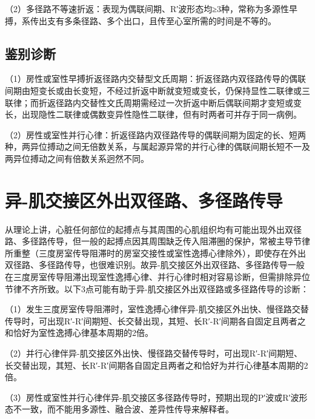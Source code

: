 （2）多径路不等速折返：表现为偶联间期、R′波形态均≥3种，常称为多源性早搏，系传出支有多条径路、多个出口，且传至心室所需的时间是不等的。

\protect\hypertarget{text00032.htmlux5cux23subid393}{}{}

\subsection{鉴别诊断}

（1）房性或室性早搏折返径路内交替型文氏周期：折返径路内双径路传导的偶联间期由短变长或由长变短，不经过折返中断就变短或变长，仍保持显性二联律或三联律；而折返径路内交替性文氏周期需经过一次折返中断后偶联间期才变短或变长，出现隐性二联律或偶数变异性隐性二联律，但有时两者可并存于同一病例。

（2）房性或室性并行心律：折返径路内双径路传导的偶联间期为固定的长、短两种，两异位搏动之间无倍数关系，与属起源异常的并行心律的偶联间期长短不一及两异位搏动之间有倍数关系迥然不同。

\protect\hypertarget{text00032.htmlux5cux23subid394}{}{}

\section{异-肌交接区外出双径路、多径路传导}

从理论上讲，心脏任何部位的起搏点与其周围的心肌组织均有可能出现外出双径路、多径路传导，但一般的起搏点因其周围缺乏传入阻滞圈的保护，常被主导节律所重整（三度房室传导阻滞时的房室交接性或室性逸搏心律除外），即使存在外出双径路、多径路传导，也很难识别。故异-肌交接区外出双径路、多径路传导一般在三度房室传导阻滞出现室性逸搏心律、并行心律时相对容易诊断，但需排除异位节律不齐所致。以下3点可能有助于异-肌交接区外出双径路或多径路传导的诊断：

（1）发生三度房室传导阻滞时，室性逸搏心律伴异-肌交接区外出快、慢径路交替传导时，可出现R′-R′间期短、长交替出现，其短、长R′-R′间期各自固定且两者之和恰好为室性逸搏心律基本周期的2倍。

（2）并行心律伴异-肌交接区外出快、慢径路交替传导时，可出现R′-R′间期短、长交替出现，其短、长R′-R′间期各自固定且两者之和恰好为并行心律基本周期的2倍。

（3）房性或室性并行心律伴异-肌交接区多径路传导时，预期出现的P′波或R′波形态不一致，而不能用多源性、融合波、差异性传导来解释者。

\protect\hypertarget{text00033.html}{}{}

\protect\hypertarget{text00033.htmlux5cux23chapter33}{}{}

